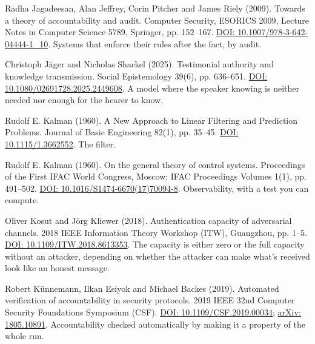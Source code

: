 \documentclass[11pt,twoside]{article}
\theoremstyle{thielethm}
\theoremstyle{thieledef}
\theoremstyle{thieledef}
\theoremstyle{thieledef}
\theoremstyle{thielethm}
\theoremstyle{thieleobs}
\theoremstyle{thielethm}
\begin{document}
\noindent Radha Jagadeesan, Alan Jeffrey, Corin Pitcher and James Riely (2009). Towards a theory of accountability and audit. Computer Security, ESORICS 2009, Lecture Notes in Computer Science 5789, Springer, pp. 152--167. \href{https://doi.org/10.1007/978-3-642-04444-1_10}{DOI: 10.1007/978-3-642-04444-1\_10}. Systems that enforce their rules after the fact, by audit.
\par\medskip

\noindent Christoph J\"ager and Nicholas Shackel (2025). Testimonial authority and knowledge transmission. Social Epistemology 39(6), pp. 636--651. \href{https://doi.org/10.1080/02691728.2025.2449608}{DOI: 10.1080/02691728.2025.2449608}. A model where the speaker knowing is neither needed nor enough for the hearer to know.
\par\medskip

\noindent Rudolf E. Kalman (1960). A New Approach to Linear Filtering and Prediction Problems. Journal of Basic Engineering 82(1), pp. 35--45. \href{https://doi.org/10.1115/1.3662552}{DOI: 10.1115/1.3662552}. The filter.
\par\medskip

\noindent Rudolf E. Kalman (1960). On the general theory of control systems. Proceedings of the First IFAC World Congress, Moscow; IFAC Proceedings Volumes 1(1), pp. 491--502. \href{https://doi.org/10.1016/S1474-6670(17)70094-8}{DOI: 10.1016/S1474-6670(17)70094-8}. Observability, with a test you can compute.
\par\medskip

\noindent Oliver Kosut and J\"org Kliewer (2018). Authentication capacity of adversarial channels. 2018 IEEE Information Theory Workshop (ITW), Guangzhou, pp. 1--5. \href{https://doi.org/10.1109/ITW.2018.8613353}{DOI: 10.1109/ITW.2018.8613353}. The capacity is either zero or the full capacity without an attacker, depending on whether the attacker can make what's received look like an honest message.
\par\medskip

\noindent Robert K\"unnemann, Ilkan Esiyok and Michael Backes (2019). Automated verification of accountability in security protocols. 2019 IEEE 32nd Computer Security Foundations Symposium (CSF). \href{https://doi.org/10.1109/CSF.2019.00034}{DOI: 10.1109/CSF.2019.00034}; \href{https://arxiv.org/abs/1805.10891}{arXiv: 1805.10891}. Accountability checked automatically by making it a property of the whole run.
\par\medskip
\end{document}
